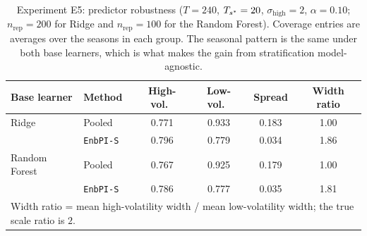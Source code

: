\begin{table}[ht]
\centering
\caption{Experiment E5: predictor robustness
         ($T = 240$, $T_{s^*} = 20$, $\sigma_{\mathrm{high}} = 2$,
         $\alpha = 0.10$; $n_{\mathrm{rep}} = 200$ for Ridge and
         $n_{\mathrm{rep}} = 100$ for the Random Forest).
         Coverage entries are averages over the seasons in each
         group.  The seasonal pattern is the same under both
         base learners, which is what makes the gain from
         stratification model-agnostic.}
\label{tab:e5_predictor}
\begin{tabular}{l l cc c c}
\toprule
Base learner & Method & High-vol.\ & Low-vol.\ & Spread & Width ratio \\
\midrule
Ridge & Pooled & 0.771 & 0.933 & 0.183 & 1.00 \\
 & \texttt{EnbPI-S} & 0.796 & 0.779 & 0.034 & 1.86 \\
\midrule
Random Forest & Pooled & 0.767 & 0.925 & 0.179 & 1.00 \\
 & \texttt{EnbPI-S} & 0.786 & 0.777 & 0.035 & 1.81 \\
\bottomrule
\multicolumn{6}{l}{\footnotesize Width ratio = mean high-volatility width / mean low-volatility width; the true scale ratio is $2$.}\\
\end{tabular}
\end{table}
